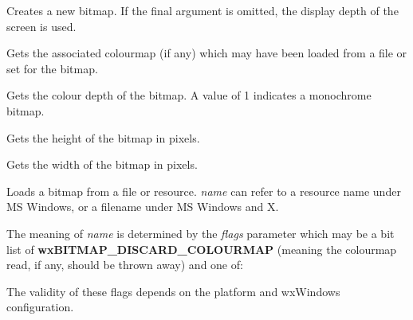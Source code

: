 
Creates a new bitmap. If the final argument is omitted, the display depth of
the screen is used.

\label{wxbitmapgetcolourmap}


Gets the associated colourmap (if any) which may have been loaded from a file
or set for the bitmap.



Gets the colour depth of the bitmap. A value of 1 indicates a
monochrome bitmap.



Gets the height of the bitmap in pixels.



Gets the width of the bitmap in pixels.



Loads a bitmap from a file or resource. {\it name} can refer
to a resource name under MS Windows, or a filename under MS Windows and X.

The meaning of {\it name} is determined by the {\it flags} parameter which
may be a bit list of {\bf wxBITMAP\_DISCARD\_COLOURMAP} (meaning the colourmap read,
if any, should be thrown away) and one of:

\begin{twocollist}\itemsep=0pt
\end{twocollist}

The validity of these flags depends on the platform and wxWindows configuration.

